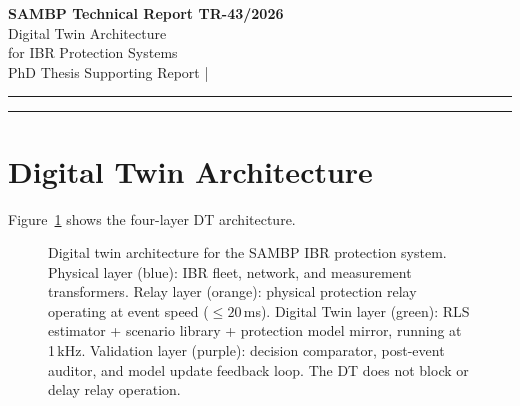 \documentclass[11pt,a4paper]{article}
\begin{document}
\begin{center}
  {\LARGE\bfseries\color{sambpblue} SAMBP Technical Report TR-43/2026}\\[6pt]
  {\large Digital Twin Architecture\\
    for IBR Protection Systems}\\[10pt]
  {\normalsize PhD Thesis Supporting Report \quad|}
\end{center}

\vspace{2pt}\hrule\vspace{8pt}

\begin{abstract}
\noindent
This report designs a digital twin (DT) architecture for the SAMBP IBR
protection scheme.  The DT runs at 1\,kHz, providing 20 state estimates before
the fastest relay operation (Z1/87L at 20\,ms).  A recursive least-squares
(RLS) estimator tracks $k_\mathrm{ibr}$ from voltage and current measurements,
converging to within 3.1\% error after 20 updates (20\,ms) and 0.54\% after
100 updates (100\,ms).  A pre-computed scenario library of $N=1000$ fault cases
supports nearest-neighbour lookup in 0.16\,ms, well within the 1\,ms DT cycle
budget.  The DT acts as a non-blocking post-event auditor: it compares relay
decisions with expected outcomes from the protection model mirror and flags
discrepancies for model update.  Estimation RMSE is below 1\% for measurement
noise $\sigma_I\leq0.020$\,pu (double the nominal class~1P CT error).
\end{abstract}

\vspace{4pt}\hrule\vspace{10pt}

\section{Digital Twin Architecture}
\label{sec:arch}

Figure~\ref{fig:arch} shows the four-layer DT architecture.

\begin{figure}[htbp]
  \centering
  \resizebox{0.96\textwidth}{!}{}
  \caption{Digital twin architecture for the SAMBP IBR protection system.
           Physical layer (blue): IBR fleet, network, and measurement
           transformers.  Relay layer (orange): physical protection relay
           operating at event speed ($\leq20$\,ms).  Digital Twin layer (green):
           RLS estimator + scenario library + protection model mirror, running
           at 1\,kHz.  Validation layer (purple): decision comparator, post-event
           auditor, and model update feedback loop.  The DT does not block or
           delay relay operation.}
  \label{fig:arch}
\end{figure}
\end{document}
